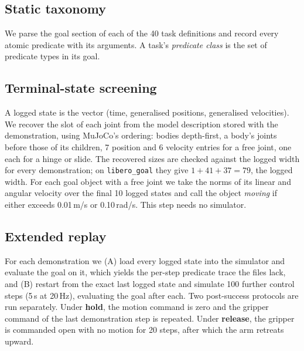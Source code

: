 \documentclass[10pt,twocolumn]{article}
\newcommand{\suite}[1]{\texttt{#1}}
\begin{document}
\subsection{Static taxonomy}
We parse the goal section of each of the 40 task definitions and record every atomic predicate with its arguments. A task's \emph{predicate class} is the set of predicate types in its goal.

\subsection{Terminal-state screening}
A logged state is the vector (time, generalised positions, generalised velocities). We recover the slot of each joint from the model description stored with the demonstration, using MuJoCo's ordering: bodies depth-first, a body's joints before those of its children, 7 position and 6 velocity entries for a free joint, one each for a hinge or slide. The recovered sizes are checked against the logged width for every demonstration; on \suite{libero\_goal} they give $1+41+37=79$, the logged width. For each goal object with a free joint we take the norms of its linear and angular velocity over the final 10 logged states and call the object \emph{moving} if either exceeds 0.01\,m/s or 0.10\,rad/s. This step needs no simulator.

\subsection{Extended replay}
\label{sec:replay}
For each demonstration we (A) load every logged state into the simulator and evaluate the goal on it, which yields the per-step predicate trace the files lack, and (B) restart from the exact last logged state and simulate 100 further control steps (5\,s at 20\,Hz), evaluating the goal after each. Two post-success protocols are run separately. Under \textbf{hold}, the motion command is zero and the gripper command of the last demonstration step is repeated. Under \textbf{release}, the gripper is commanded open with no motion for 20 steps, after which the arm retreats upward.
\end{document}
